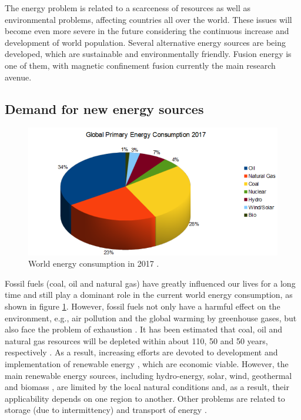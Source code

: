 The energy problem is related to a scarceness of resources as well as environmental problems, affecting countries all over the world. These issues will become even more severe in the future considering the continuous increase and development of world population. Several alternative energy sources are being developed, which are sustainable and environmentally friendly. Fusion energy is one of them, with magnetic confinement fusion currently the main research avenue.


\subsection{Demand for new energy sources}


\begin{figure}[h]
\begin{centering}
\includegraphics[scale=0.55]{energy2017.png}
\par\end{centering}
\caption{World energy consumption in 2017 \cite{BP_2017_Energy}.}
\label{fig:energy2017}
\end{figure}

Fossil fuels (coal, oil and natural gas) have greatly influenced our lives for a long time and still play a dominant role in the current world energy consumption, as shown in figure \ref{fig:energy2017}. However, fossil fuels not only have a harmful effect on the environment, e.g., air pollution and the global warming by greenhouse gases, but also face the problem of exhaustion \cite{Abas_2015_Fs}. It has been estimated that coal, oil and natural gas resources will be depleted within about 110, 50 and 50 years, respectively \cite{Shafiee_2009_NP}. As a result, increasing efforts are devoted to development and implementation of renewable energy \cite{Akella_2009_RE}, which are economic viable. However, the main renewable energy sources, including hydro-energy, solar, wind, geothermal and biomass \cite{Fridleifsson_2001_RSER, Momirlan_2005_IJHE, Jacobson_2011_EP}, are limited by the local natural conditions and, as a result, their applicability depends on one region to another\cite{Panwar_2011_RSER}. Other problems are related to storage (due to intermittency) and transport of energy \cite{Agbossou_2004_IEEE, Kaldellis_2007_En, Rentizelas_2009_RSER}.





